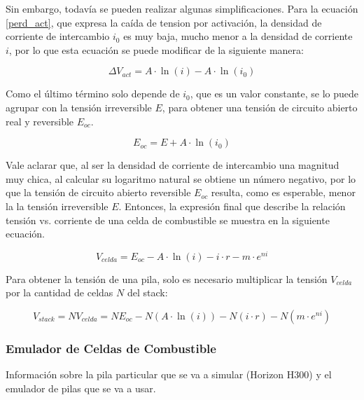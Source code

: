 Sin embargo, todavía se pueden realizar algunas simplificaciones. Para la ecuación \ref{perd_act}, que expresa la caída de tension por activación, la densidad de corriente de intercambio $i_0$ es muy baja, mucho menor a la densidad de corriente $i$, por lo que esta ecuación se puede modificar de la siguiente manera:

\begin{equation}
    \Delta V_{act} = A\cdot \ln(i) - A\cdot \ln(i_0)
\end{equation}

Como el último término solo depende de $i_0$, que es un valor constante, se lo puede agrupar con la tensión irreversible $E$, para obtener una tensión de circuito abierto real y reversible $E_{oc}$.

\begin{equation}
    E_{oc} = E + A\cdot\ln(i_0)
\end{equation}

Vale aclarar que, al ser la densidad de corriente de intercambio una magnitud muy chica, al calcular su logaritmo natural se obtiene un número negativo, por lo que la tensión de circuito abierto reversible $E_{oc}$ resulta, como es esperable, menor la la tensión irreversible $E$. Entonces, la expresión final que describe la relación tensión vs. corriente de una celda de combustible se muestra en la siguiente ecuación.

\begin{equation}\label{v_celda}
    \boxed{V_{celda} = E_{oc} - A\cdot\ln(i) - i\cdot r - m\cdot e^{ni}}
\end{equation}

Para obtener la tensión de una pila, solo es necesario multiplicar la tensión $V_{celda}$ por la cantidad de celdas $N$ del stack:

\begin{equation}\label{v_stack}
    V_{stack} = NV_{celda} = NE_{oc} - N(A\cdot\ln(i)) - N(i\cdot r) - N(m\cdot e^{ni})
\end{equation}

\subsubsection{Emulador de Celdas de Combustible}

Información sobre la pila particular que se va a simular (Horizon H300) y el emulador de pilas que se va a usar.\\